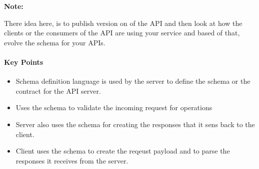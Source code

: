 \documentclass[a4paper, 11pt]{book}
\newenvironment{note}{
    \begin{siderule}
        \textbf{Note: }
        }{
    \end{siderule}
}
\begin{document}
    \begin{note}
        There idea here, is to publish version on of the API and then look at how the clients or the consumers of the API are using your service and based of that, evolve the schema for your APIs.
    \end{note}

    \paragraph{Key Points}
    \begin{itemize}
        \item Schema definition language is used by the server to define the schema or the contract for the API server.
        \item Uses the schema to validate the incoming request for operations
        \item Server also uses the schema for creating the responses that it sens back to the client.
        \item Client uses the schema to create the reqeust payload and to parse the responses it receives from the server.
    \end{itemize}

\end{document}
